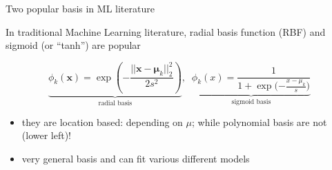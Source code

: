\documentclass[ignorenonframetext,aspectratio=169]{beamer}
\providecommand{\tightlist}{%
  \setlength{\itemsep}{0pt}\setlength{\parskip}{0pt}}
\newcommand{\vv}[1]{\boldsymbol{#1}}
\begin{document}
\begin{frame}{Two popular basis in ML literature}
\protect\hypertarget{two-popular-basis-in-ml-literature}{}

In traditional Machine Learning literature, radial basis function (RBF)
and sigmoid (or ``tanh'') are popular

\[\underbrace{\phi_k(\vv{x}) = \exp{(-\frac{||\vv{x}-\vv{\mu}_k||_2^2}{2s^2})}}_{\text{radial basis}}, \;\; \underbrace{\phi_k(x) = \frac{1}{1+\exp{(-\frac{{x}-{\mu}_k}{s}})}}_{\text{sigmoid basis}}\]

\begin{itemize}
\tightlist
\item
  they are location based: depending on \(\mu\); while polynomial basis
  are not (lower left)!
\item
  very general basis and can fit various different models
\end{itemize}


\end{frame}
\end{document}
